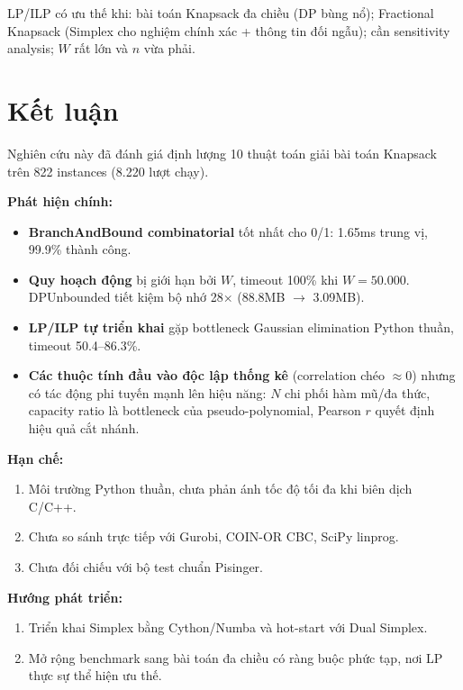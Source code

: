 LP/ILP có ưu thế khi: bài toán Knapsack đa chiều (DP bùng nổ); Fractional Knapsack (Simplex cho nghiệm chính xác + thông tin đối ngẫu); cần sensitivity analysis; $W$ rất lớn và $n$ vừa phải.


\clearpage
\section{Kết luận}
\label{sec:concl}

Nghiên cứu này đã đánh giá định lượng 10 thuật toán giải bài toán Knapsack trên 822 instances (8.220 lượt chạy).

\textbf{Phát hiện chính:}
\begin{itemize}[leftmargin=*]
    \item \textbf{BranchAndBound combinatorial} tốt nhất cho 0/1: 1.65ms trung vị, 99.9\% thành công.
    \item \textbf{Quy hoạch động} bị giới hạn bởi $W$, timeout 100\% khi $W=50.000$. DPUnbounded tiết kiệm bộ nhớ 28$\times$ (88.8MB $\to$ 3.09MB).
    \item \textbf{LP/ILP tự triển khai} gặp bottleneck Gaussian elimination Python thuần, timeout 50.4--86.3\%.
    \item \textbf{Các thuộc tính đầu vào độc lập thống kê} (correlation chéo $\approx 0$) nhưng có tác động phi tuyến mạnh lên hiệu năng: $N$ chi phối hàm mũ/đa thức, capacity ratio là bottleneck của pseudo-polynomial, Pearson $r$ quyết định hiệu quả cắt nhánh.
\end{itemize}

\textbf{Hạn chế:}
\begin{enumerate}[leftmargin=*]
    \item Môi trường Python thuần, chưa phản ánh tốc độ tối đa khi biên dịch C/C++.
    \item Chưa so sánh trực tiếp với Gurobi, COIN-OR CBC, SciPy linprog.
    \item Chưa đối chiếu với bộ test chuẩn Pisinger.
\end{enumerate}

\textbf{Hướng phát triển:}
\begin{enumerate}[leftmargin=*]
    \item Triển khai Simplex bằng Cython/Numba và hot-start với Dual Simplex.
    \item Mở rộng benchmark sang bài toán đa chiều có ràng buộc phức tạp, nơi LP thực sự thể hiện ưu thế.
\end{enumerate}
